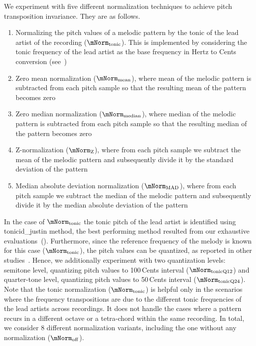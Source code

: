 We experiment with five different normalization techniques to achieve pitch transposition invariance. They are as follows.

\begin{enumerate}
	\item Normalizing the pitch values of a melodic pattern by the tonic of the lead artist of the recording ($\mNorm_{\mathrm{tonic}}$). This is implemented by considering the tonic frequency of the lead artist as the base frequency in Hertz to Cents conversion (see~)

	\item Zero mean normalization ($\mNorm_{\mathrm{mean}}$), where mean of the melodic pattern is subtracted from each pitch sample so that the resulting mean of the pattern becomes zero
	
	\item Zero median normalization ($\mNorm_{\mathrm{median}}$), where median of the melodic pattern is subtracted from each pitch sample so that the resulting median of the pattern becomes zero
	\item Z-normalization ($\mNorm_{\mathrm{Z}}$), where from each pitch sample we subtract the mean of the melodic pattern and subsequently divide it by the standard deviation of the pattern
	\item Median absolute deviation normalization ($\mNorm_{\mathrm{MAD}}$), where from each pitch sample we subtract the median of the melodic pattern and subsequently divide it by the median absolute deviation of the pattern
\end{enumerate}

In the case of $\mNorm_{\mathrm{tonic}}$ the tonic pitch of the lead artist is identified using \acrshort{tonicid_justin} method, the best performing method resulted from our exhaustive evaluations~(). Furthermore, since the reference frequency of the melody is known for this case ($\mNorm_{\mathrm{tonic}}$), the pitch values can be quantized, as reported in other studies~\citep{Ross2012b}. Hence, we additionally experiment with two quantization levels: semitone level, quantizing pitch values to 100\,Cents interval ($\mNorm_{\mathrm{tonicQ12}}$) and quarter-tone level, quantizing pitch values to 50\,Cents interval ($\mNorm_{\mathrm{tonicQ24}}$). Note that the tonic normalization ($\mNorm_{\mathrm{tonic}}$) is helpful only in the scenarios where the frequency transpositions are due to the different tonic frequencies of the lead artists across recordings. It does not handle the cases where a pattern recurs in a different octave or a tetra-chord within the same recording. In total, we consider 8 different normalization variants, including the one without any normalization ($\mNorm_{\mathrm{off}}$). 


